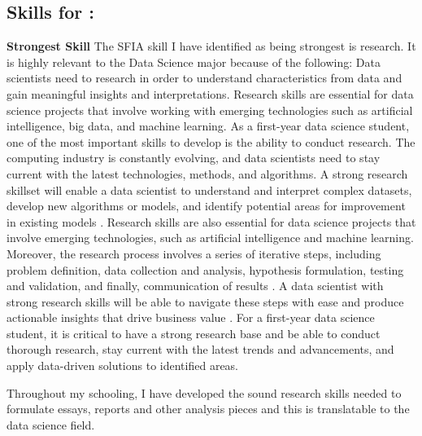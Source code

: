 \documentclass[a4paper, 11pt]{report}
\begin{document}
\subsection{Skills for \majB: \studB}
\textbf{Strongest Skill}
\newline The SFIA skill I have identified as being strongest is research. It is highly relevant to the Data Science major because of the following: Data scientists need to research in order to understand characteristics from data and gain meaningful insights and interpretations. Research skills are essential for data science projects that involve working with emerging technologies such as artificial intelligence, big data, and machine learning. As a first-year data science student, one of the most important skills to develop is the ability to conduct research. The computing industry is constantly evolving, and data scientists need to stay current with the latest technologies, methods, and algorithms. 
\newline 
A strong research skillset will enable a data scientist to understand and interpret complex datasets, develop new algorithms or models, and identify potential areas for improvement in existing models \cite{Research}. Research skills are also essential for data science projects that involve emerging technologies, such as artificial intelligence and machine learning.
\newline Moreover, the research process involves a series of iterative steps, including problem definition, data collection and analysis, hypothesis formulation, testing and validation, and finally, communication of results \cite{Violino}. A data scientist with strong research skills will be able to navigate these steps with ease and produce actionable insights that drive business value \cite{Research}.
For a first-year data science student, it is critical to have a strong research base and be able to conduct thorough research, stay current with the latest trends and advancements, and apply data-driven solutions to identified areas.

Throughout my schooling, I have developed the sound research skills needed to formulate essays, reports and other analysis pieces and this is translatable to the data science field. 
\end{document}
